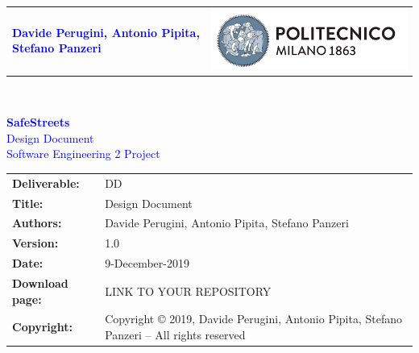 




\begin{titlepage}



{\begin{table}[t!]
\centering
\begin{tabu} to \textwidth { X[1.3,r,p] X[1.7,l,p] }
\textcolor{Blue}
{\textbf{\small{Davide Perugini, Antonio Pipita, Stefano Panzeri}}} & \includegraphics[scale=0.5]{Images/PolimiLogo}
\end{tabu}
\end{table}}~\\ [7cm]


\begin{flushleft}

{\textcolor{Blue}{\textbf{\Huge{SafeStreets}} \linebreak \\ 
		Design Document \\
		Software Engineering 2 Project}} \\ [1cm]

\end{flushleft}

\end{titlepage}

\begin{table}[h!]
\begin{tabu} to \textwidth { X[0.3,r,p] X[0.7,l,p] }
\hline

\textbf{Deliverable:} & DD\\
\textbf{Title:} & Design Document \\
\textbf{Authors:} & Davide Perugini, Antonio Pipita, Stefano Panzeri\\
\textbf{Version:} & 1.0 \\ 
\textbf{Date:} & 9-December-2019 \\
\textbf{Download page:} & LINK TO YOUR REPOSITORY \\
\textbf{Copyright:} & Copyright © 2019, Davide Perugini, Antonio Pipita, Stefano Panzeri – All rights reserved \\
\hline
\end{tabu}
\end{table}




